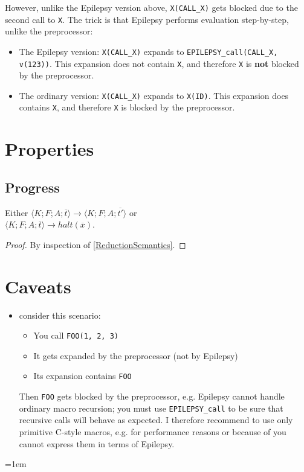 \documentclass[12pt]{article}
\theoremstyle{break}
\begin{document}
However, unlike the Epilepsy version above, \texttt{X(CALL\_X)} gets blocked \cite{Blueprinting} due to the
second call to \texttt{X}. The trick is that Epilepsy performs evaluation step-by-step,
unlike the preprocessor:

\begin{itemize}
    \item The Epilepsy version: \texttt{X(CALL\_X)} expands to \texttt{EPILEPSY\_call(CALL\_X, v(123))}.
    This expansion does not contain \texttt{X}, and therefore \texttt{X} is \textbf{not}
    blocked by the preprocessor.

    \item The ordinary version: \texttt{X(CALL\_X)} expands to \texttt{X(ID)}. This expansion
    does contains \texttt{X}, and therefore \texttt{X} is blocked by the preprocessor.
\end{itemize}

\section{Properties}

\subsection{Progress}

\begin{proposition}[Progress]
Either $\langle K; F; A; \overline{t} \rangle \to \langle K; F; A; \overline{t'} \rangle$ or \\
$\langle K; F; A; \overline{t} \rangle \to halt(\overline{x})$.
\end{proposition}

\begin{proof}
By inspection of \ref{ReductionSemantics}.
\end{proof}

\section{Caveats}

\begin{itemize}
\item consider this scenario:
    \begin{itemize}
        \item You call \texttt{FOO(1, 2, 3)}
        \item It gets expanded by the preprocessor (not by Epilepsy)
        \item Its expansion contains \texttt{FOO}
    \end{itemize}
Then \texttt{FOO} gets blocked \cite{Blueprinting} by the preprocessor, e.g. Epilepsy cannot handle ordinary
macro recursion; you must use \texttt{EPILEPSY\_call} to be sure that recursive calls
will behave as expected. I therefore recommend to use only primitive C-style macros, e.g.
for performance reasons or because of you cannot express them in terms of Epilepsy.
\end{itemize}

\emergencystretch=1em
\printbibliography
\end{document}

